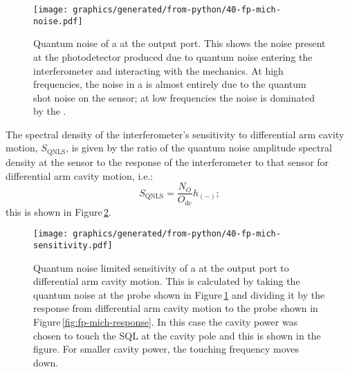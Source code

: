 \begin{figure}
  \centering
  \texttt{[image: graphics/generated/from-python/40-fp-mich-noise.pdf]}
  \caption[Quantum noise of a \FPMI{} at the output port]{\label{fig:fp-mich-noise}Quantum noise of a \FPMI{} at the output port. This shows the noise present at the photodetector produced due to quantum noise entering the interferometer and interacting with the mechanics. At high frequencies, the noise in a \MI{} is almost entirely due to the quantum shot noise on the sensor; at low frequencies the noise is dominated by the .}
\end{figure}

The spectral density of the interferometer's sensitivity to differential arm cavity motion, $S_{\text{QNLS}}$, is given by the ratio of the quantum noise amplitude spectral density at the sensor to the response of the interferometer to that sensor for differential arm cavity motion, i.e.:
\begin{equation}
  S_{\text{QNLS}} = \frac{N_O}{O_{\text{dc}}} h_{\left( - \right)};
\end{equation}
this is shown in Figure\,\ref{fig:fp-mich-sensitivity}.

\begin{figure}
  \centering
  \texttt{[image: graphics/generated/from-python/40-fp-mich-sensitivity.pdf]}
  \caption[Sensitivity of a \FPMI{} at the output port to differential arm cavity motion]{\label{fig:fp-mich-sensitivity}Quantum noise limited sensitivity of a \FPMI{} at the output port to differential arm cavity motion. This is calculated by taking the quantum noise at the probe shown in Figure\,\ref{fig:fp-mich-noise} and dividing it by the response from differential arm cavity motion to the probe shown in Figure\,\ref{fig:fp-mich-response}. In this case the cavity power was chosen to touch the \gls{SQL} at the cavity pole and this is shown in the figure. For smaller cavity power, the touching frequency moves down.}
\end{figure}


